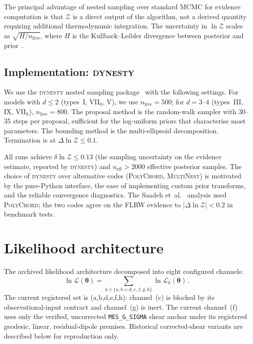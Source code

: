 The principal advantage of nested sampling over standard MCMC
for evidence computation is that $\mathcal{Z}$ is a direct
output of the algorithm, not a derived quantity requiring
additional thermodynamic integration.  The uncertainty in
$\ln\mathcal{Z}$ scales as $\sqrt{H/n_{\mathrm{live}}}$,
where $H$ is the Kullback--Leibler divergence between posterior
and prior~\cite{Skilling2004}.


\subsection{Implementation: \textsc{dynesty}}
\label{sec:dynesty}

We use the \textsc{dynesty} nested sampling
package~\cite{Speagle2020} with the following settings.  For
models with $d \leq 2$ (types~I, VII$_0$, V), we use
$n_{\mathrm{live}} = 500$; for $d = 3$--$4$ (types~III, IX,
VII$_h$), $n_{\mathrm{live}} = 800$.  The proposal method is
the random-walk sampler with 30--35 steps per proposal,
sufficient for the log-uniform priors that characterise most
parameters.  The bounding method is the multi-ellipsoid
decomposition.  Termination is at
$\Delta\ln\mathcal{Z} \leq 0.1$.

All runs achieve $\delta\ln\mathcal{Z} \leq 0.13$ (the sampling
uncertainty on the evidence estimate, reported by
\textsc{dynesty}) and $n_{\mathrm{eff}} > 2000$ effective
posterior samples.  The choice of \textsc{dynesty} over
alternative codes (\textsc{PolyChord}, \textsc{MultiNest}) is
motivated by the pure-Python interface, the ease of implementing
custom prior transforms, and the reliable convergence diagnostics.
The Saadeh et~al.~\cite{Saadeh2016b} analysis used
\textsc{PolyChord}; the two codes agree on the FLRW evidence to
$|\Delta\ln\mathcal{Z}| < 0.2$ in benchmark tests.


\section{Likelihood architecture}
\label{sec:evidence-method}

The archived likelihood architecture decomposed into eight
configured channels:
\begin{equation}\label{eq:logL-total}
\ln\mathcal{L}(\boldsymbol{\theta})
= \sum_{k \in \{a,b,c,d,e,f,g,h\}}
  \ln\mathcal{L}_k(\boldsymbol{\theta})\,.
\end{equation}
The current registered set is (a,b,d,e,f,h): channel~(c) is blocked
by its observational-input contract and channel~(g) is inert.  The
current channel~(f) uses only the verified, uncorrected
\texttt{MES\_G\_SIGMA} shear anchor under its registered geodesic,
linear, residual-dipole premises.  Historical corrected-shear
variants are described below for reproduction only.

